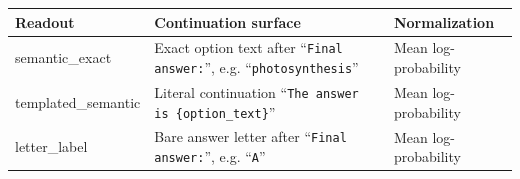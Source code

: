 \begin{tabularx}{\linewidth}{@{}lXl@{}}
\toprule
Readout & Continuation surface & Normalization \\
\midrule
semantic\_exact & Exact option text after ``\texttt{Final answer:}'', e.g. ``\texttt{photosynthesis}'' & Mean log-probability \\
templated\_semantic & Literal continuation ``\texttt{The answer is \{option\_text\}}'' & Mean log-probability \\
letter\_label & Bare answer letter after ``\texttt{Final answer:}'', e.g. ``\texttt{A}'' & Mean log-probability \\
\bottomrule
\end{tabularx}
